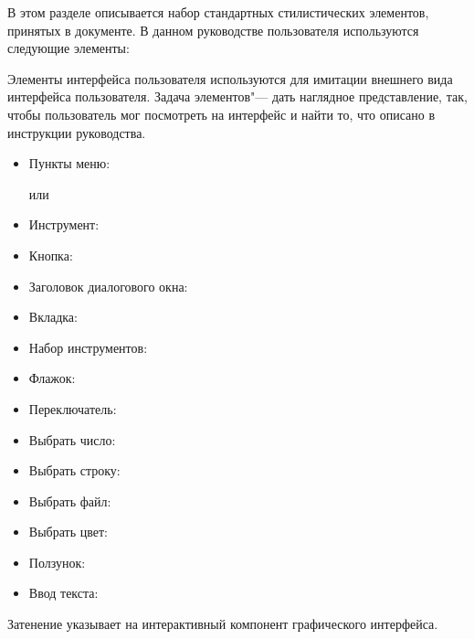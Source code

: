 

\label{label_conventions}

В этом разделе описывается набор стандартных стилистических элементов,
принятых в документе. В данном руководстве пользователя
используются следующие элементы:


Элементы интерфейса пользователя используются для имитации внешнего
вида интерфейса пользователя. Задача элементов"--- дать наглядное
представление, так, чтобы пользователь мог посмотреть на интерфейс и
найти то, что описано в инструкции руководства.

\begin{itemize}[label=--,itemsep=5pt]
\item Пункты меню:  \arrow
{}

или

 \arrow
{} \arrow {}
\item Инструмент: 
\item Кнопка: 
\item Заголовок диалогового окна: 
\item Вкладка: 
\item Набор инструментов: 
\item Флажок: 
\item Переключатель:  
\item Выбрать число: 
\item Выбрать строку: 
\item Выбрать файл: \browsebutton
\item Выбрать цвет: 
\item Ползунок: 
\item Ввод текста: 
\end{itemize}
Затенение указывает на интерактивный компонент графического интерфейса.

